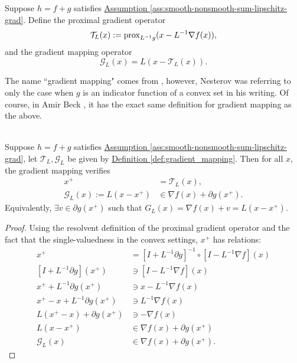 \documentclass[12pt]{article}
\begin{document}
    \begin{definition}
        \label{def:gradient_mapping}
        Suppose $h = f + g$ satisfies 
        \hyperref[ass:smooth-nonsmooth-sum-lipschitz-grad]
        {Assumption \ref*{ass:smooth-nonsmooth-sum-lipschitz-grad}}. 
        Define the proximal gradient operator
        $$
            \mathcal T_L(x) := \operatorname{prox}_{L^{-1}g}(x - L^{-1}\nabla f(x)),
        $$
        and the gradient mapping operator
        $$
            \mathcal G_L(x) = L(x - \mathcal T_L(x)). 
        $$
    \end{definition}
    \begin{remark}
        The name ``gradient mapping" comes from \cite[(2.2.54)]{nesterov_lectures_2018}, however, Nesterov was referring to only the case when $g$ is an indicator function of a convex set in his writing. 
        Of course, in Amir Beck \cite[10.3.2]{beck_first-order_2017}, it has the exact same definition for gradient mapping as the above. 
    \end{remark}

    \begin{lemma}
    \label{lemma:grad-map-approx-subgrad}\; \\
        Suppose $h = f + g$ satisfies 
        \hyperref[ass:smooth-nonsmooth-sum-lipschitz-grad]
        {Assumption \ref{ass:smooth-nonsmooth-sum-lipschitz-grad}}, 
        let $\mathcal T_L, \mathcal G_L$ be given by 
        \hyperref[def:gradient_mapping]{Definition \ref*{def:gradient_mapping}}.
        Then for all $x$, the gradient mapping verifies
        \begin{align*}
            x^+ &= \mathcal T_L(x), 
            \\
            \mathcal G_L(x) := L(x - x^+) &\in  \nabla f(x) + \partial g(x^+). 
        \end{align*}
        Equivalently, $\exists v \in \partial g(x^+)$ such that $G_L(x) = \nabla f(x) + v = L(x - x^+)$. 
    \end{lemma}
    \begin{proof}
        Using the resolvent definition of the proximal gradient operator and the fact that the single-valuedness in the convex settings, $x^+$ has relations: 
        \begin{align*}
            x^+ &= [I + L^{-1}\partial g]^{-1}\circ [I - L^{-1}\nabla f](x)
            \\
            [I + L^{-1}\partial g](x^+) &\ni [I - L^{-1}\nabla f](x)
            \\
            x^+ + L^{-1}\partial g(x^+) &\ni x - L^{-1}\nabla f(x)
            \\
            x^+ - x + L^{-1}\partial g(x^+) &\ni L^{-1}\nabla f(x)
            \\
            L(x^+ - x) + \partial g(x^+) &\ni - \nabla f(x)
            \\
            L(x - x^+) &\in \nabla f(x) + \partial g(x^+)
            \\
            \mathcal G_L(x) &\in \nabla f(x) + \partial g(x^+). 
        \end{align*}
    \end{proof}
\end{document}
